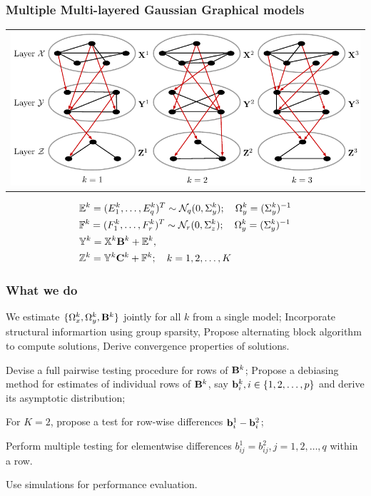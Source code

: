 \documentclass[10pt]{beamer}
\theoremstyle{definition}
\begin{document}
\begin{frame}
\frametitle{Multiple Multi-layered Gaussian Graphical models}

\begin{tabular}{c}
\includegraphics[width=.9\textwidth]{multi2layer}
\end{tabular}

%
\begin{align*}
& {\mathbb{E}}^k = (E_1^k, \ldots, E_q^k)^T \sim {\cal{N}}_q (0, \Sigma_y^k); \quad
\Omega_y^k = (\Sigma_y^k)^{-1}\\
& {\mathbb{F}}^k = (F_1^k, \ldots, F_r^k)^T \sim {\cal{N}}_r (0, \Sigma_z^k); \quad
\Omega_y^k = (\Sigma_y^k)^{-1}\\
& {\mathbb{Y}}^k = {\mathbb{X}}^k {\mathbf{B}}^k + {\mathbb{E}}^k,\\
& {\mathbb{Z}}^k = {\mathbb{Y}}^k {\mathbf{C}}^k + {\mathbb{F}}^k; \quad k = 1, 2, \ldots, K
\end{align*}
%

\end{frame}

\begin{frame} %
\frametitle{What we do}

\begin{outline}
\1 We estimate $\{ \Omega_x^k, \Omega_y^k, {\mathbf{B}}^k \}$ jointly for all $k$ from a single model;
\2 Incorporate structural informartion using group sparsity,
\2 Propose alternating block algorithm to compute solutions,
\2 Derive convergence properties of solutions.

\vspace{1em}
\1 Devise a full pairwise testing procedure for rows of ${\mathbf{B}}^k$;
\2 Propose a debiasing method for estimates of individual rows of ${\mathbf{B}}^k$, say ${\bf{b}}_i^k, i \in \{ 1, 2, \ldots, p \}$ and derive its asymptotic distribution;

\2 For $K=2$, propose a test for row-wise differences ${\bf{b}}_i^1 - {\bf{b}}_i^2$;

\2 Perform multiple testing for elementwise differences $b_{ij}^1 = b_{ij}^2, j = 1, 2, \ldots, q$ within a row.

\vspace{1em}
\1 Use simulations for performance evaluation.
\end{outline}
\end{frame}
\end{document}
